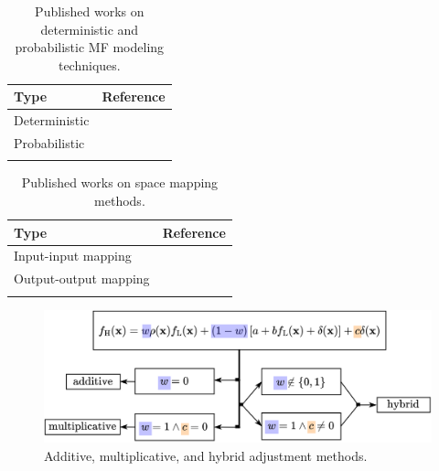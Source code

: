 \documentclass[iicol,sn-basic]{sn-jnl}%
\theoremstyle{thmstyleone}%
\theoremstyle{thmstyletwo}
\theoremstyle{thmstylethree}
\begin{document}
\begin{linenumbers}
\begin{table}
	\caption{Published works on deterministic and probabilistic MF modeling techniques.}
	\label{Table2}
	\centering
	\begin{tabularx}{\textwidth}{lX}
		\hline \noalign{\smallskip}
		Type & Reference\\
		\hline \noalign{\smallskip}
		Deterministic & \cite{Zhang2018,Godino2019,Song2019,Kou2019,Durantin2017,Han2013,Tyan2015,Nguyen2015,LYan2019,Rumpfkeil2017,Rumpfkeil2019,Wang2021}  \\
		\noalign{\smallskip}
		Probabilistic &    \cite{Kennedy2000,Forrester2007,Xiong2008,Kuya2011,Toal2011,Han2012,Keane2012,Goh2013,Park2017,Serani2019,Qian2008,Gratiet2013,Gratiet2014,Parussini2017,Xiao2018,Ji2021}\\
		\hline \noalign{\smallskip}
	\end{tabularx}
\end{table}

\begin{table}
	\caption{Published works on space mapping methods.}
	\label{Table3}
	\centering
	\begin{tabularx}{\textwidth}{lX}
		\hline \noalign{\smallskip}
		Type & Reference\\
		\hline \noalign{\smallskip}
	 	Input-input mapping & \cite{Bandler1994,Bandler2004,Koziel2006,Robinson2008,Tao2019} \\
		\noalign{\smallskip}
		Output-output mapping &  \cite{Zheng2014,Zhou2017,Perdikaris2017,Jiang2018,Cutajar2019,Hebbal2021b,Li2023}   \\
		\hline \noalign{\smallskip}
	\end{tabularx}
\end{table}

\begin{figure}
	\centering
	\includegraphics[scale=0.9]{Fig2.png}
	\caption{Additive, multiplicative, and hybrid adjustment methods.}
	\label{Fig2}
\end{figure}


\end{linenumbers}
\end{document}
